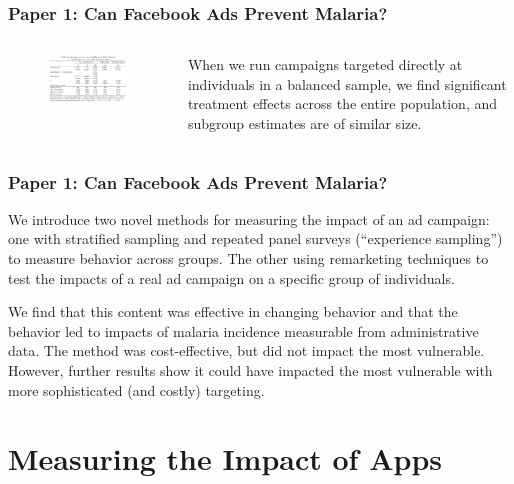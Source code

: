 \documentclass[aspectratio=169]{beamer}
\begin{document}
\begin{frame}
\frametitle{Paper 1: Can Facebook Ads Prevent Malaria?}


\begin{columns}

\begin{figure}[]
\includegraphics[width=280px]{resources/individual-effect-results.png} 
\end{figure} 


When we run campaigns targeted directly at individuals in a balanced sample, we find significant treatment effects across the entire population, and subgroup estimates are of similar size. 
\end{columns}

\end{frame}

\begin{frame}
  \frametitle{Paper 1: Can Facebook Ads Prevent Malaria?}

We introduce two novel methods for measuring the impact of an ad campaign: one with stratified sampling and repeated panel surveys (``experience sampling'') to measure behavior across groups. The other using remarketing techniques to test the impacts of a real ad campaign on a specific group of individuals. 

We find that this content was effective in changing behavior and that the behavior led to impacts of malaria incidence measurable from administrative data. The method was cost-effective, but did not impact the most vulnerable. However, further results show it could have impacted the most vulnerable with more sophisticated (and costly) targeting. 

\end{frame}

\section{Measuring the Impact of Apps}
\end{document}
